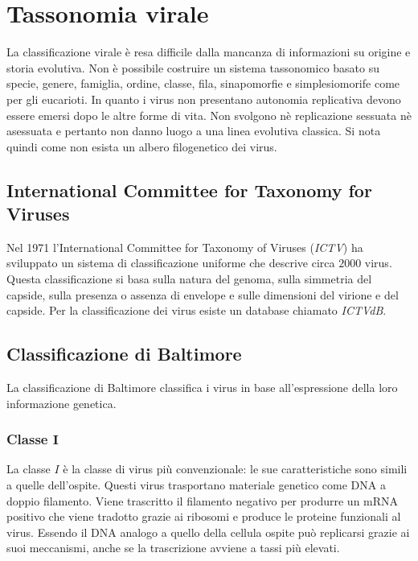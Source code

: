 \section{Tassonomia virale}
La classificazione virale \`e resa difficile dalla mancanza di informazioni su origine e storia evolutiva.
Non \`e possibile costruire un sistema tassonomico basato su specie, genere, famiglia, ordine, classe, fila, sinapomorfie e simplesiomorife come per gli eucarioti.
In quanto i virus non presentano autonomia replicativa devono essere emersi dopo le altre forme di vita.
Non svolgono n\`e replicazione sessuata n\`e asessuata e pertanto non danno luogo a una linea evolutiva classica. 
Si nota quindi come non esista un albero filogenetico dei virus. 

	\subsection{International Committee for Taxonomy for Viruses}
	Nel 1971 l'International Committee for Taxonomy of Viruses (\emph{ICTV}) ha sviluppato un sistema di classificazione uniforme che descrive circa $2000$ virus. 
	Questa classificazione si basa sulla natura del genoma, sulla simmetria del capside, sulla presenza o assenza di envelope e sulle dimensioni del virione e del capside. 
	Per la classificazione dei virus esiste un database chiamato \emph{ICTVdB}.

	\subsection{Classificazione di Baltimore}
	La classificazione di Baltimore classifica i virus in base all'espressione della loro informazione genetica.
	
		\subsubsection{Classe $\mathbf{I}$}
		La classe $I$ \`e la classe di virus pi\`u convenzionale: le sue caratteristiche sono simili a quelle dell'ospite.
		Questi virus trasportano materiale genetico come DNA a doppio filamento.
		Viene trascritto il filamento negativo per produrre un mRNA positivo che viene tradotto grazie ai ribosomi e produce le proteine funzionali al virus.
		Essendo il DNA analogo a quello della cellula ospite pu\`o replicarsi grazie ai suoi meccanismi, anche se la trascrizione avviene a tassi pi\`u elevati.

